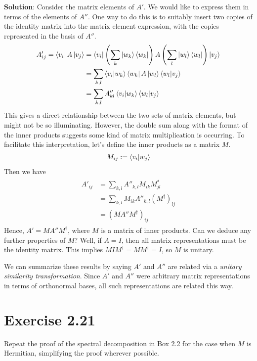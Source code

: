 \documentclass{book}
\begin{document}
    \textbf{Solution}: Consider the matrix elements of $A'$. We would like to express them in terms of the elements of $A''$. One way to do this is to suitably insert two copies of the identity matrix into the matrix element expression, with the copies represented in the basis of $A''$. 
    \begin{align}
    \begin{aligned}
        A'_{ij} = \bra{v_i}A\ket{v_j} &= \bra{v_i}\left(\sum_k \ket{w_k}\bra{w_k}\right) A \left(\sum_l \ket{w_l}\bra{w_l}\right)\ket{v_j} \\
        &= \sum_{k,l} \bra{v_i}\ket{w_k}\bra{w_k}A\ket{w_l}\bra{w_l}\ket{v_j} \\
        &= \sum_{k,l}A''_{kl} \braket{v_i}{w_k}\braket{w_l}{v_j}
    \end{aligned}
    \end{align}
    This gives a direct relationship between the two sets of matrix elements, but might not be so illuminating. However, the double sum along with the format of the inner products suggests some kind of matrix multiplication is occurring. To facilitate this interpretation, let's define the inner products as a matrix $M$.
    \begin{align}
        M_{ij} := \bra{v_i}\ket{w_j}
    \end{align}
    Then we have
    \begin{align}
    \begin{aligned}
        A'_{ij} &= \sum_{k,l} A''_{k,l} M_{ik} M_{jl}^* \\
        &= \sum_{k,l} M_{ik} A''_{k,l} (M^\dagger)_{lj} \\
        &= (M A'' M^\dagger)_{ij}
    \end{aligned}
    \end{align}
    Hence, $A' = M A'' M^\dagger$, where $M$ is a matrix of inner products. Can we deduce any further properties of $M$? Well, if $A= I$, then all matrix representations must be the identity matrix. This implies $M I M^\dagger = M M^\dagger = I$, so $M$ is unitary. 
    
    We can summarize these results by saying $A'$ and $A''$ are related via a \emph{unitary similarity transformation}. Since $A'$ and $A''$ were arbitrary matrix representations in terms of orthonormal bases, all such representations are related this way. 
    
\section*{Exercise 2.21}
    Repeat the proof of the spectral decomposition in Box 2.2 for the case when $M$ is Hermitian, simplifying the proof wherever possible.
    
\end{document}
